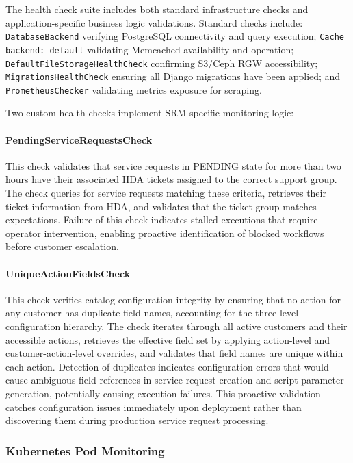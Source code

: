 The health check suite includes both standard infrastructure checks and application-specific business logic validations. Standard checks include: \texttt{DatabaseBackend} verifying PostgreSQL connectivity and query execution; \texttt{Cache backend: default} validating Memcached availability and operation; \texttt{DefaultFileStorageHealthCheck} confirming S3/Ceph RGW accessibility; \texttt{MigrationsHealthCheck} ensuring all Django migrations have been applied; and \texttt{PrometheusChecker} validating metrics exposure for scraping.

Two custom health checks implement SRM-specific monitoring logic:

\paragraph{PendingServiceRequestsCheck}
This check validates that service requests in PENDING state for more than two hours have their associated HDA tickets assigned to the correct support group. The check queries for service requests matching these criteria, retrieves their ticket information from HDA, and validates that the ticket group matches expectations. Failure of this check indicates stalled executions that require operator intervention, enabling proactive identification of blocked workflows before customer escalation.

\paragraph{UniqueActionFieldsCheck}
This check verifies catalog configuration integrity by ensuring that no action for any customer has duplicate field names, accounting for the three-level configuration hierarchy. The check iterates through all active customers and their accessible actions, retrieves the effective field set by applying action-level and customer-action-level overrides, and validates that field names are unique within each action. Detection of duplicates indicates configuration errors that would cause ambiguous field references in service request creation and script parameter generation, potentially causing execution failures. This proactive validation catches configuration issues immediately upon deployment rather than discovering them during production service request processing.

\subsubsection{Kubernetes Pod Monitoring}

